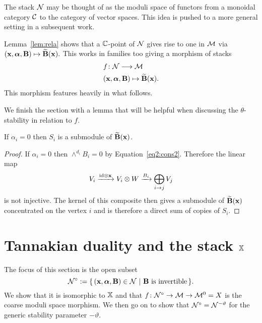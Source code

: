 \documentclass{amsart}
\newcommand{\balpha}{\boldsymbol{\alpha}}
\theoremstyle{definition}
\begin{document}
\begin{remark}
The stack $\mathcal{N}$ may be thought of as the moduli space of functors from a monoidal category $\mathcal{C}$ to the category of vector spaces.
This idea is pushed to a more general setting in a subsequent work.
\end{remark}

Lemma~\ref{lem:rela} shows that a $\mathbb{C}$-point of $\mathcal{N}$ gives rise to one in $\mathcal{M}$ via $(\bfx, \balpha, \bfB) \mapsto \widetilde{\bfB}(\bfx).$
This works in families too giving a morphism of stacks
\begin{align*}
    & f \colon \cN \longrightarrow \cM \\
    & (\bfx, \balpha, \bfB) \mapsto \widetilde{\bfB}(\bfx).
\end{align*}
This morphism features heavily in what follows.

We finish the section with a lemma that will be helpful when discussing the $\theta$-stability in relation to $f$.

\begin{lemma}\label{lem:Si}
If $\alpha_i=0$ then $S_i$ is a submodule of $\widetilde{\mathbf{B}}(\mathbf{x})$.
\end{lemma}

\begin{proof}
If $\alpha_i=0$ then $\wedge^{d_i} B_i=0$ by Equation~\ref{eq2:cons2}.
Therefore the linear map $$V_{i} \xrightarrow{\textup{id} \otimes \mathbf{x}} V_{i} \otimes W \xrightarrow{B_{i}} \bigoplus_{i \rightarrow j} V_j$$ is not injective.
The kernel of this composite then gives a submodule of $\widetilde{\mathbf{B}}(\mathbf{x})$ concentrated on the vertex $i$ and is therefore a direct sum of copies of $S_i$.
\end{proof}


\section{Tannakian duality and the stack $\mathbb{X}$}

The focus of this section is the open subset $$\cN^\circ:= \{\,(\bfx, \balpha, \bfB) \in \cN \,\,|\,\, \bfB \text{ is invertible} \,\}.$$
We show that it is isomorphic to $\mathbb{X}$ and that $f \colon \mathcal{N}^\circ \rightarrow \mathcal{M} \rightarrow \mathcal{M}^0=X$ is the coarse moduli space morphism.
We then go on to show that $\mathcal{N}^\circ = \mathcal{N}^{-\vartheta}$ for the generic stability parameter $-\vartheta$.
\end{document}
